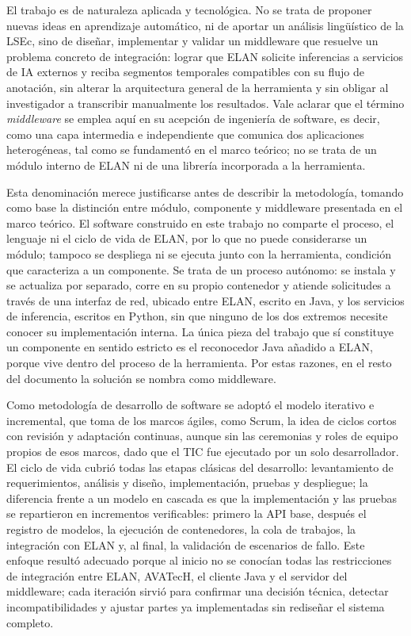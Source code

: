 El trabajo es de naturaleza aplicada y tecnológica. No se trata de proponer nuevas ideas en aprendizaje automático, ni de aportar un análisis lingüístico de la LSEc, sino de diseñar, implementar y validar un middleware que resuelve un problema concreto de integración: lograr que ELAN solicite inferencias a servicios de IA externos y reciba segmentos temporales compatibles con su flujo de anotación, sin alterar la arquitectura general de la herramienta y sin obligar al investigador a transcribir manualmente los resultados. Vale aclarar que el término \textit{middleware} se emplea aquí en su acepción de ingeniería de software, es decir, como una capa intermedia e independiente que comunica dos aplicaciones heterogéneas, tal como se fundamentó en el marco teórico; no se trata de un módulo interno de ELAN ni de una librería incorporada a la herramienta.

Esta denominación merece justificarse antes de describir la metodología, tomando como base la distinción entre módulo, componente y middleware presentada en el marco teórico. El software construido en este trabajo no comparte el proceso, el lenguaje ni el ciclo de vida de ELAN, por lo que no puede considerarse un módulo; tampoco se despliega ni se ejecuta junto con la herramienta, condición que caracteriza a un componente. Se trata de un proceso autónomo: se instala y se actualiza por separado, corre en su propio contenedor y atiende solicitudes a través de una interfaz de red, ubicado entre ELAN, escrito en Java, y los servicios de inferencia, escritos en Python, sin que ninguno de los dos extremos necesite conocer su implementación interna. La única pieza del trabajo que sí constituye un componente en sentido estricto es el reconocedor Java añadido a ELAN, porque vive dentro del proceso de la herramienta. Por estas razones, en el resto del documento la solución se nombra como middleware.

Como metodología de desarrollo de software se adoptó el modelo iterativo e incremental, que toma de los marcos ágiles, como Scrum, la idea de ciclos cortos con revisión y adaptación continuas, aunque sin las ceremonias y roles de equipo propios de esos marcos, dado que el TIC fue ejecutado por un solo desarrollador. El ciclo de vida cubrió todas las etapas clásicas del desarrollo: levantamiento de requerimientos, análisis y diseño, implementación, pruebas y despliegue; la diferencia frente a un modelo en cascada es que la implementación y las pruebas se repartieron en incrementos verificables: primero la API base, después el registro de modelos, la ejecución de contenedores, la cola de trabajos, la integración con ELAN y, al final, la validación de escenarios de fallo. Este enfoque resultó adecuado porque al inicio no se conocían todas las restricciones de integración entre ELAN, AVATecH, el cliente Java y el servidor del middleware; cada iteración sirvió para confirmar una decisión técnica, detectar incompatibilidades y ajustar partes ya implementadas sin rediseñar el sistema completo.

